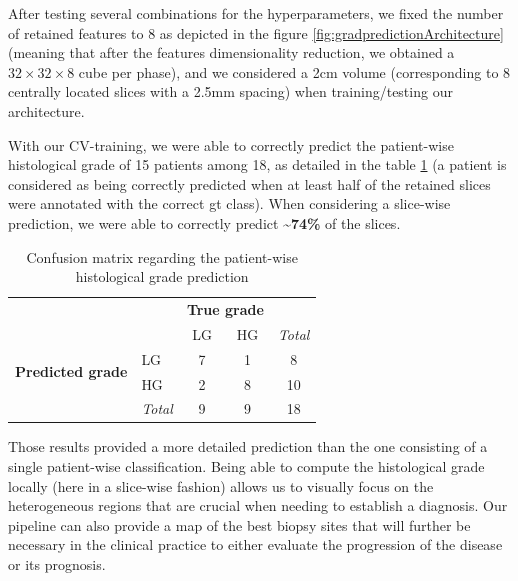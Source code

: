After testing several combinations for the hyperparameters, we
fixed the number of retained features to 8 as depicted in the
figure \ref{fig:gradpredictionArchitecture} (meaning that after the features dimensionality reduction,
we obtained a $ 32\times32\times8 $ cube per phase), and we considered a 2cm volume
(corresponding to 8 centrally located slices with a 2.5mm spacing) when
training/testing our architecture.

With our CV-training, we were able to correctly predict the patient-wise
histological grade of 15 patients among 18, as detailed in the table \ref{tab:confusion_matrix} (a patient is considered as being correctly predicted
when at least half of the retained slices were annotated with the
correct \ac{gt} class).
When considering a slice-wise prediction, we were able to correctly
predict \textbf{\textasciitilde{}74\%} of the slices.
\renewcommand{\arraystretch}{2}
\begin{table}[!htp]\centering
\caption{Confusion matrix regarding the patient-wise  histological grade prediction}\label{tab:confusion_matrix}
\begin{tabular}{l|l|c|c|c}
\multicolumn{2}{c}{}&\multicolumn{2}{c}{\textbf{True grade}}&\\
\cline{3-4}
\multicolumn{2}{c|}{}&LG&HG&\multicolumn{1}{c}{\textit{Total}}\\
\cline{2-4}
\multirow{2}{*}{\textbf{Predicted grade}}& LG & 7 & 1 & 8\\
\cline{2-4}
& HG & 2 & 8 & 10 \\
\cline{2-4}
\multicolumn{1}{c}{} & \multicolumn{1}{c}{\textit{Total}} & \multicolumn{1}{c}{9} & \multicolumn{    1}{c}{9} & \multicolumn{1}{c}{18}\\
\end{tabular}
\end{table}
\renewcommand{\arraystretch}{5}
Those results provided a more detailed prediction than the one
consisting of a single patient-wise classification. Being able to
compute the histological grade locally (here in a slice-wise fashion)
allows us to visually focus on the heterogeneous regions that are
crucial when needing to establish a diagnosis. Our pipeline can also
provide a map of the best biopsy sites that will further be necessary in
the clinical practice to either evaluate the progression of the disease
or its prognosis.


